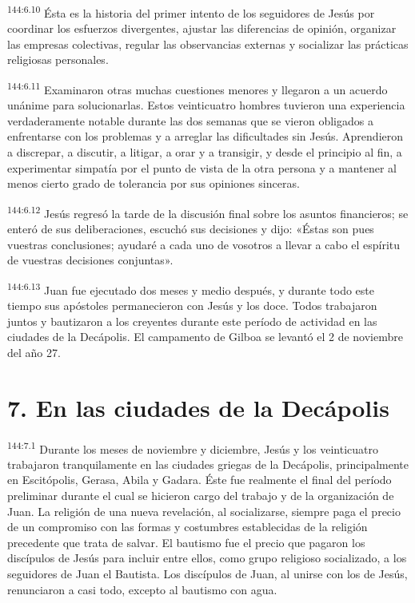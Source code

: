 \par
\textsuperscript{144:6.10} Ésta es la historia del primer intento de los seguidores de Jesús por coordinar los esfuerzos divergentes, ajustar las diferencias de opinión, organizar las empresas colectivas, regular las observancias externas y socializar las prácticas religiosas personales.

\par
\textsuperscript{144:6.11} Examinaron otras muchas cuestiones menores y llegaron a un acuerdo unánime para solucionarlas. Estos veinticuatro hombres tuvieron una experiencia verdaderamente notable durante las dos semanas que se vieron obligados a enfrentarse con los problemas y a arreglar las dificultades sin Jesús. Aprendieron a discrepar, a discutir, a litigar, a orar y a transigir, y desde el principio al fin, a experimentar simpatía por el punto de vista de la otra persona y a mantener al menos cierto grado de tolerancia por sus opiniones sinceras.

\par
\textsuperscript{144:6.12} Jesús regresó la tarde de la discusión final sobre los asuntos financieros; se enteró de sus deliberaciones, escuchó sus decisiones y dijo: «Éstas son pues vuestras conclusiones; ayudaré a cada uno de vosotros a llevar a cabo el espíritu de vuestras decisiones conjuntas».

\par
\textsuperscript{144:6.13} Juan fue ejecutado dos meses y medio después, y durante todo este tiempo sus apóstoles permanecieron con Jesús y los doce. Todos trabajaron juntos y bautizaron a los creyentes durante este período de actividad en las ciudades de la Decápolis. El campamento de Gilboa se levantó el 2 de noviembre del año 27.

\section*{7. En las ciudades de la Decápolis}
\par
\textsuperscript{144:7.1} Durante los meses de noviembre y diciembre, Jesús y los veinticuatro trabajaron tranquilamente en las ciudades griegas de la Decápolis, principalmente en Escitópolis, Gerasa, Abila y Gadara. Éste fue realmente el final del período preliminar durante el cual se hicieron cargo del trabajo y de la organización de Juan. La religión de una nueva revelación, al socializarse, siempre paga el precio de un compromiso con las formas y costumbres establecidas de la religión precedente que trata de salvar. El bautismo fue el precio que pagaron los discípulos de Jesús para incluir entre ellos, como grupo religioso socializado, a los seguidores de Juan el Bautista. Los discípulos de Juan, al unirse con los de Jesús, renunciaron a casi todo, excepto al bautismo con agua.

